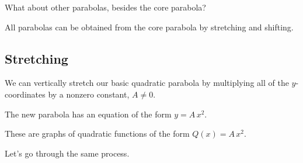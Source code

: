 \documentclass{ximera}
\begin{document}
What about other parabolas, besides the core parabola? 

All parabolas can be obtained from the core parabola by stretching and shifting. 



























\subsection*{Stretching}



We can vertically stretch our basic quadratic parabola by multiplying all of the $y$-coordinates by a nonzero constant, $A \ne 0$. 


The new parabola has an equation of the form $y = A \, x^2$. 

These are graphs of quadratic functions of the form $Q(x) = A \, x^2$. 


Let's go through the same process. 
\end{document}
